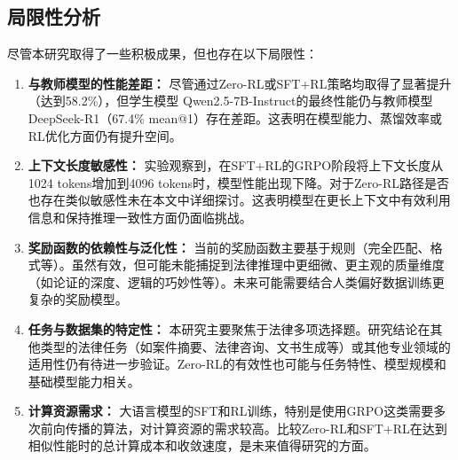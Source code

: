 \documentclass{pkuthesis}
\newcommand{\qwen}{Qwen2.5-7B-Instruct}
\newcommand{\deepseekr}{DeepSeek-R1}
\begin{document}
\subsection{局限性分析}
尽管本研究取得了一些积极成果，但也存在以下局限性：
\begin{enumerate}
    \item \textbf{与教师模型的性能差距：} 尽管通过Zero-RL或SFT+RL策略均取得了显著提升（达到58.2\%），但学生模型 \qwen 的最终性能仍与教师模型 \deepseekr （67.4\% mean@1）存在差距。这表明在模型能力、蒸馏效率或RL优化方面仍有提升空间。
    \item \textbf{上下文长度敏感性：} 实验观察到，在SFT+RL的GRPO阶段将上下文长度从1024 tokens增加到4096 tokens时，模型性能出现下降。对于Zero-RL路径是否也存在类似敏感性未在本文中详细探讨。这表明模型在更长上下文中有效利用信息和保持推理一致性方面仍面临挑战。
    \item \textbf{奖励函数的依赖性与泛化性：} 当前的奖励函数主要基于规则（完全匹配、格式等）。虽然有效，但可能未能捕捉到法律推理中更细微、更主观的质量维度（如论证的深度、逻辑的巧妙性等）。未来可能需要结合人类偏好数据训练更复杂的奖励模型。
    \item \textbf{任务与数据集的特定性：} 本研究主要聚焦于法律多项选择题。研究结论在其他类型的法律任务（如案件摘要、法律咨询、文书生成等）或其他专业领域的适用性仍有待进一步验证。Zero-RL的有效性也可能与任务特性、模型规模和基础模型能力相关。
    \item \textbf{计算资源需求：} 大语言模型的SFT和RL训练，特别是使用GRPO这类需要多次前向传播的算法，对计算资源的需求较高。比较Zero-RL和SFT+RL在达到相似性能时的总计算成本和收敛速度，是未来值得研究的方面。
\end{enumerate}
\end{document}
